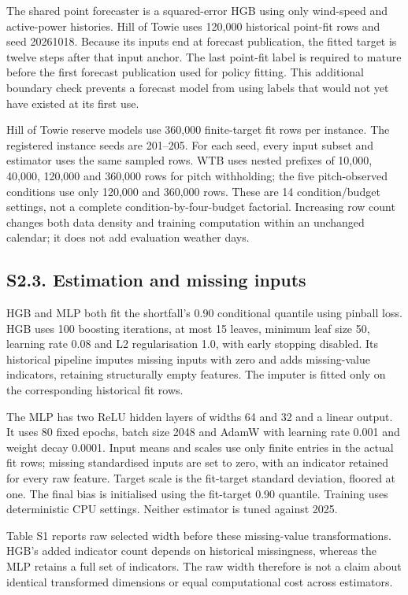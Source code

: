 \documentclass[
  british,
  11pt,
]{article}
\begin{document}
The shared point forecaster is a squared-error HGB using only wind-speed
and active-power histories. Hill of Towie uses 120,000 historical
point-fit rows and seed 20261018. Because its inputs end at forecast
publication, the fitted target is twelve steps after that input anchor.
The last point-fit label is required to mature before the first forecast
publication used for policy fitting. This additional boundary check
prevents a forecast model from using labels that would not yet have
existed at its first use.

Hill of Towie reserve models use 360,000 finite-target fit rows per
instance. The registered instance seeds are 201--205. For each seed,
every input subset and estimator uses the same sampled rows. WTB uses
nested prefixes of 10,000, 40,000, 120,000 and 360,000 rows for pitch
withholding; the five pitch-observed conditions use only 120,000 and
360,000 rows. These are 14 condition/budget settings, not a complete
condition-by-four-budget factorial. Increasing row count changes both
data density and training computation within an unchanged calendar; it
does not add evaluation weather days.

\subsection{S2.3. Estimation and missing
inputs}\label{s2.3.-estimation-and-missing-inputs}

HGB and MLP both fit the shortfall's 0.90 conditional quantile using
pinball loss. HGB uses 100 boosting iterations, at most 15 leaves,
minimum leaf size 50, learning rate 0.08 and L2 regularisation 1.0, with
early stopping disabled. Its historical pipeline imputes missing inputs
with zero and adds missing-value indicators, retaining structurally
empty features. The imputer is fitted only on the corresponding
historical fit rows.

The MLP has two ReLU hidden layers of widths 64 and 32 and a linear
output. It uses 80 fixed epochs, batch size 2048 and AdamW with learning
rate 0.001 and weight decay 0.0001. Input means and scales use only
finite entries in the actual fit rows; missing standardised inputs are
set to zero, with an indicator retained for every raw feature. Target
scale is the fit-target standard deviation, floored at one. The final
bias is initialised using the fit-target 0.90 quantile. Training uses
deterministic CPU settings. Neither estimator is tuned against 2025.

Table S1 reports raw selected width before these missing-value
transformations. HGB's added indicator count depends on historical
missingness, whereas the MLP retains a full set of indicators. The raw
width therefore is not a claim about identical transformed dimensions or
equal computational cost across estimators.
\end{document}
